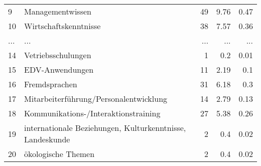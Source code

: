 \begin{longtable}{lXrrr}
        9 & \multicolumn{1}{X}{Managementwissen} & %
          \num{49} &
          \num[round-mode=places,round-precision=2]{9.76} &
          \num[round-mode=places,round-precision=2]{0.47} \\
        10 & \multicolumn{1}{X}{Wirtschaftskenntnisse} & %
          \num{38} &
          \num[round-mode=places,round-precision=2]{7.57} &
          \num[round-mode=places,round-precision=2]{0.36} \\
       ... & ... & ... & ... & ... \\
        14 & \multicolumn{1}{X}{Vetriebsschulungen} & %
          \num{1} &
          \num[round-mode=places,round-precision=2]{0.2} &
          \num[round-mode=places,round-precision=2]{0.01} \\

        15 & \multicolumn{1}{X}{EDV-Anwendungen} & %
          \num{11} &
          \num[round-mode=places,round-precision=2]{2.19} &
          \num[round-mode=places,round-precision=2]{0.1} \\

        16 & \multicolumn{1}{X}{Fremdsprachen} & %
          \num{31} &
          \num[round-mode=places,round-precision=2]{6.18} &
          \num[round-mode=places,round-precision=2]{0.3} \\

        17 & \multicolumn{1}{X}{Mitarbeiterführung/Personalentwicklung} & %
          \num{14} &
          \num[round-mode=places,round-precision=2]{2.79} &
          \num[round-mode=places,round-precision=2]{0.13} \\

        18 & \multicolumn{1}{X}{Kommunikations-/Interaktionstraining} & %
          \num{27} &
          \num[round-mode=places,round-precision=2]{5.38} &
          \num[round-mode=places,round-precision=2]{0.26} \\

        19 & \multicolumn{1}{X}{internationale Beziehungen, Kulturkenntnisse, Landeskunde} & %
          \num{2} &
          \num[round-mode=places,round-precision=2]{0.4} &
          \num[round-mode=places,round-precision=2]{0.02} \\

        20 & \multicolumn{1}{X}{ökologische Themen} & %
          \num{2} &
          \num[round-mode=places,round-precision=2]{0.4} &
          \num[round-mode=places,round-precision=2]{0.02} \\


\end{longtable}
